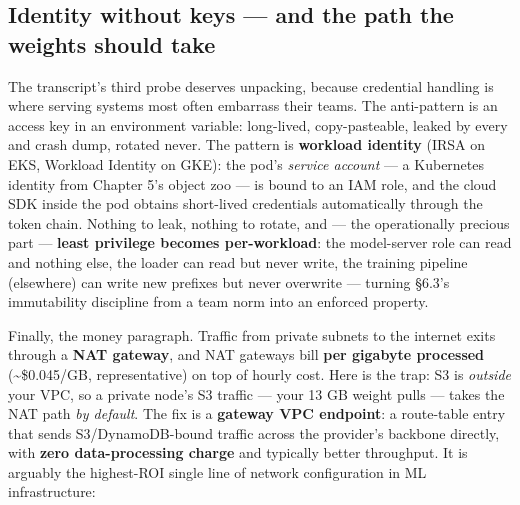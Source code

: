 \subsection*{Identity without keys — and the path the weights should take}

The transcript's third probe deserves unpacking, because credential handling is where serving systems most often embarrass their teams. The anti-pattern is an access key in an environment variable: long-lived, copy-pasteable, leaked by every  and crash dump, rotated never. The pattern is \textbf{workload identity} (IRSA on EKS, Workload Identity on GKE): the pod's \textit{service account} — a Kubernetes identity from Chapter 5's object zoo — is bound to an IAM role, and the cloud SDK inside the pod obtains short-lived credentials automatically through the token chain. Nothing to leak, nothing to rotate, and — the operationally precious part — \textbf{least privilege becomes per-workload}: the model-server role can read  and nothing else, the loader can read but never write, the training pipeline (elsewhere) can write new prefixes but never overwrite — turning §6.3's immutability discipline from a team norm into an enforced property.

Finally, the money paragraph. Traffic from private subnets to the internet exits through a \textbf{NAT gateway}, and NAT gateways bill \textbf{per gigabyte processed} (\textasciitilde{}\$0.045/GB, representative) on top of hourly cost. Here is the trap: S3 is \textit{outside} your VPC, so a private node's S3 traffic — your 13 GB weight pulls — takes the NAT path \textit{by default}. The fix is a \textbf{gateway VPC endpoint}: a route-table entry that sends S3/DynamoDB-bound traffic across the provider's backbone directly, with \textbf{zero data-processing charge} and typically better throughput. It is arguably the highest-ROI single line of network configuration in ML infrastructure:

